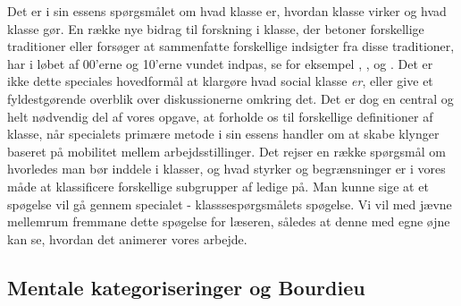 Det er i sin essens spørgsmålet om hvad klasse er, hvordan klasse virker og hvad klasse gør. En række nye bidrag til forskning i klasse, der betoner forskellige traditioner eller forsøger at sammenfatte forskellige indsigter fra disse traditioner, har i løbet af 00'erne og 10'erne vundet indpas, se for eksempel \textcite{Lareau2008}, \textcite{Resnick2006}, \textcite{Savage2013} og \textcite{Andrade2014}. Det er ikke dette speciales hovedformål at klargøre hvad social klasse \emph{er}, eller give et fyldestgørende overblik over diskussionerne omkring det. Det er dog en central og helt nødvendig del af vores opgave, at forholde os til forskellige definitioner af klasse, når specialets primære metode i sin essens handler om at skabe klynger baseret på mobilitet mellem arbejdsstillinger. Det rejser en række spørgsmål om hvorledes man bør inddele i klasser, og hvad styrker og begrænsninger er i vores måde at klassificere forskellige subgrupper af ledige på. Man kunne sige at et spøgelse vil gå gennem specialet - klasssespørgsmålets spøgelse. Vi vil med jævne mellemrum fremmane dette spøgelse for læseren, således at denne med egne øjne kan se, hvordan det animerer vores arbejde.

\subsection{Mentale kategoriseringer og Bourdieu}

